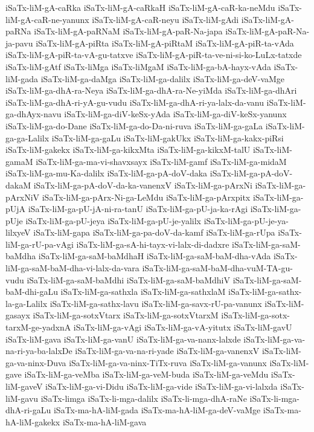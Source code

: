 {iSaTx-liM-gA-caRka
iSaTx-liM-gA-caRkaH
iSaTx-liM-gA-caR-ka-neMdu
iSaTx-liM-gA-caR-ne-yanunx
iSaTx-liM-gA-caR-neyu
iSaTx-liM-gAdi
iSaTx-liM-gA-paRNa
iSaTx-liM-gA-paRNaM
iSaTx-liM-gA-paR-Na-japa
iSaTx-liM-gA-paR-Na-ja-pavu
iSaTx-liM-gA-piRta
iSaTx-liM-gA-piRtaM
iSaTx-liM-gA-piR-ta-vAda
iSaTx-liM-gA-piR-ta-vA-gu-tatxve
iSaTx-liM-gA-piR-ta-ve-ni-si-ko-LuLx-tatxde
iSaTx-liM-gAtf
iSaTx-liMga
iSaTx-liMgaM
iSaTx-liM-ga-bA-hayx-vAda
iSaTx-liM-gada
iSaTx-liM-ga-daMga
iSaTx-liM-ga-dalilx
iSaTx-liM-ga-deV-vaMge
iSaTx-liM-ga-dhA-ra-Neya
iSaTx-liM-ga-dhA-ra-Ne-yiMda
iSaTx-liM-ga-dhAri
iSaTx-liM-ga-dhA-ri-yA-gu-vudu
iSaTx-liM-ga-dhA-ri-ya-lalx-da-vanu
iSaTx-liM-ga-dhAyx-navu
iSaTx-liM-ga-diV-keSx-yAda
iSaTx-liM-ga-diV-keSx-yanunx
iSaTx-liM-ga-do-Dane
iSaTx-liM-ga-do-Da-ni-ruva
iSaTx-liM-ga-gaLa
iSaTx-liM-ga-ga-Lalilx
iSaTx-liM-ga-gaLu
iSaTx-liM-gakUkx
iSaTx-liM-ga-kakx-piRsi
iSaTx-liM-gakekx
iSaTx-liM-ga-kikxMta
iSaTx-liM-ga-kikxM-talU
iSaTx-liM-gamaM
iSaTx-liM-ga-ma-vi-shavxsayx
iSaTx-liM-gamf
iSaTx-liM-ga-midaM
iSaTx-liM-ga-mu-Ka-dalilx
iSaTx-liM-ga-pA-doV-daka
iSaTx-liM-ga-pA-doV-dakaM
iSaTx-liM-ga-pA-doV-da-ka-vanenxV
iSaTx-liM-ga-pArxNi
iSaTx-liM-ga-pArxNiV
iSaTx-liM-ga-pArx-Ni-ga-LeMdu
iSaTx-liM-ga-pArxpitx
iSaTx-liM-ga-pUjA
iSaTx-liM-ga-pU-jA-ni-ra-tanU
iSaTx-liM-ga-pU-ja-ka-rAgi
iSaTx-liM-ga-pUje
iSaTx-liM-ga-pU-jeya
iSaTx-liM-ga-pU-je-yalilx
iSaTx-liM-ga-pU-je-ya-lilxyeV
iSaTx-liM-gapa
iSaTx-liM-ga-pa-doV-da-kamf
iSaTx-liM-ga-rUpa
iSaTx-liM-ga-rU-pa-vAgi
iSaTx-liM-ga-sA-hi-tayx-vi-lalx-di-dadxre
iSaTx-liM-ga-saM-baMdha
iSaTx-liM-ga-saM-baMdhaH
iSaTx-liM-ga-saM-baM-dha-vAda
iSaTx-liM-ga-saM-baM-dha-vi-lalx-da-vara
iSaTx-liM-ga-saM-baM-dha-vuM-TA-gu-vudu
iSaTx-liM-ga-saM-baMdhi
iSaTx-liM-ga-saM-baMdhiV
iSaTx-liM-ga-saM-baM-dhi-gaLu
iSaTx-liM-ga-sathxla
iSaTx-liM-ga-sathxlaM
iSaTx-liM-ga-sathx-la-ga-Lalilx
iSaTx-liM-ga-sathx-lavu
iSaTx-liM-ga-savx-rU-pa-vanunx
iSaTx-liM-gasayx
iSaTx-liM-ga-sotxVtarx
iSaTx-liM-ga-sotxVtarxM
iSaTx-liM-ga-sotx-tarxM-ge-yadxnA
iSaTx-liM-ga-vAgi
iSaTx-liM-ga-vA-yitutx
iSaTx-liM-gavU
iSaTx-liM-gava
iSaTx-liM-ga-vanU
iSaTx-liM-ga-va-nanx-lalxde
iSaTx-liM-ga-va-na-ri-ya-ba-lalxDe
iSaTx-liM-ga-va-na-ri-yade
iSaTx-liM-ga-vanenxV
iSaTx-liM-ga-va-ninx-Duva
iSaTx-liM-ga-va-ninx-TiTx-ruva
iSaTx-liM-ga-vanunx
iSaTx-liM-gave
iSaTx-liM-ga-veMba
iSaTx-liM-ga-veM-buda
iSaTx-liM-ga-veMdu
iSaTx-liM-gaveV
iSaTx-liM-ga-vi-Didu
iSaTx-liM-ga-vide
iSaTx-liM-ga-vi-lalxda
iSaTx-liM-gavu
iSaTx-limga
iSaTx-li-mga-dalilx
iSaTx-li-mga-dhA-raNe
iSaTx-li-mga-dhA-ri-gaLu
iSaTx-ma-hA-liM-gada
iSaTx-ma-hA-liM-ga-deV-vaMge
iSaTx-ma-hA-liM-gakekx
iSaTx-ma-hA-liM-gava
}

